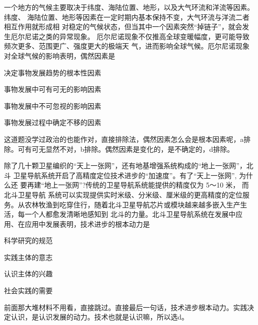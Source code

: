\documentclass[lang=cn,newtx,10pt,scheme=chinese,pad,twocol]{zznote}
\begin{document}
\begin{exercise}一个地方的气候主要取决于纬度、海陆位置、地形，以及大气环流和洋流等因素。纬度、 海陆位置、地形等因素在一定时期内基本保持不变，大气环流与洋流二者相互作用就形成相 对稳定的气候状态，但当其中一个因素突然“掉链子”，就会发生厄尔尼诺之类的异常现象。 厄尔尼诺现象不仅推高全球变暖幅度，更可能导致频次更多、范围更广、强度更大的极端天 气，进而影响全球气候。厄尔尼诺现象对全球气候的影响表明，偶然因素是
	\begin{choice}
		\item 决定事物发展趋势的根本性因素
		\item 事物发展中可有可无的影响因素
		\item 事物发展中不可忽视的影响因素
		\item 事物发展过程中确定不移的因素
	\end{choice}
\end{exercise}
\begin{solution}
	这道题没学过政治的也能作对，直接排除法，偶然因素怎么会是根本因素呢，a排除。可有可无显然不对，b排除。偶然因素是变化的，是不确定的，d排除。
\end{solution}


\begin{exercise}除了几十颗卫星编织的“天上一张网”，还有地基增强系统构成的“地上一张网”，北斗 卫星导航系统开启了高精度定位技术进步的“加速度”。有了“天上一张网”, 为什么还 要再建“地上一张网”?传统的卫星导航系统能提供的精度仅为 5～10 米， 而北斗卫星导航 系统可以实现提供实时米级、分米级、厘米级的更高精度的定位服 务。从农林牧渔到吃穿住行，随着北斗卫星导航芯片或模块越来越多嵌入生产生活，每一个人都愈发清晰地感知到 北斗的力量。北斗卫星导航系统在发展中应用、在应用中发展表明，技术进步的根本动力是
	\begin{choice}
		\item 科学研究的规范
		\item 实践主体的意志
		\item 认识主体的兴趣
		\item 社会实践的需要
	\end{choice}
\end{exercise}
\begin{solution}
	前面那大堆材料不用看，直接跳过。直接最后一句话，技术进步根本动力。实践决定认识，是认识发展的动力。技术也就是认识嘛，所以选d。
\end{solution}
\end{document}

